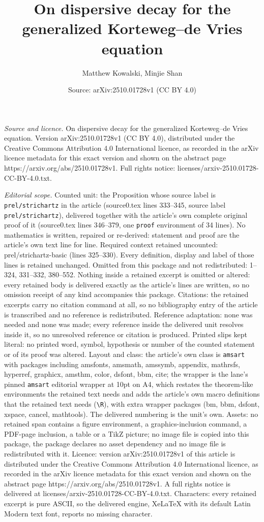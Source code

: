 \documentclass[10pt,a4paper]{amsart}
\title[On dispersive decay for the generalized Korteweg--de Vries e]{On dispersive decay for the generalized Korteweg--de Vries equation}
\author{Matthew Kowalski, Minjie Shan}
\date{Source: arXiv:2510.01728v1 (CC BY 4.0)}
\begin{document}
\maketitle

\noindent\emph{Source and licence.} On dispersive decay for the generalized Korteweg--de Vries equation. Version arXiv:2510.01728v1 (CC BY 4.0), distributed under the Creative Commons Attribution 4.0 International licence, as recorded in the arXiv licence metadata for this exact version and shown on the abstract page https://arxiv.org/abs/2510.01728v1. Full rights notice: licenses/arxiv-2510.01728-CC-BY-4.0.txt.\par\smallskip

\noindent\textit{Editorial scope.} Counted unit: the Proposition whose source label is \texttt{prel/strichartz} in the article (source0.tex lines 333--345, source label \texttt{prel/strichartz}), delivered together with the article's own complete original proof of it (source0.tex lines 346--379, one \texttt{proof} environment of 34 lines). No mathematics is written, repaired or re-derived: statement and proof are the article's own text line for line. Required context retained uncounted: prel/strichartz-basic (lines 325--330). Every definition, display and label of those lines is retained unchanged. Omitted from this package and not redistributed: 1--324, 331--332, 380--552. Nothing inside a retained excerpt is omitted or altered: every retained body is delivered exactly as the article's lines are written, so no omission receipt of any kind accompanies this package. Citations: the retained excerpts carry no citation command at all, so no bibliography entry of the article is transcribed and no reference is redistributed. Reference adaptation: none was needed and none was made; every reference inside the delivered unit resolves inside it, so no unresolved reference or citation is produced. Printed slips kept literal: no printed word, symbol, hypothesis or number of the counted statement or of its proof was altered. Layout and class: the article's own class is \texttt{amsart} with packages including amsfonts, amsmath, amssymb, appendix, mathrsfs, hyperref, graphicx, amsthm, color, dsfont, bbm, cite; the wrapper is the lane's pinned \texttt{amsart} editorial wrapper at 10pt on A4, which restates the theorem-like environments the retained text needs and adds the article's own macro definitions that the retained text needs (\texttt{\textbackslash R}), with extra wrapper packages (bm, bbm, dsfont, xspace, cancel, mathtools). The delivered numbering is the unit's own. Assets: no retained span contains a figure environment, a graphics-inclusion command, a PDF-page inclusion, a table or a TikZ picture; no image file is copied into this package, the package declares no asset dependency and no image file is redistributed with it. Licence: version arXiv:2510.01728v1 of this article is distributed under the Creative Commons Attribution 4.0 International licence, as recorded in the arXiv licence metadata for this exact version and shown on the abstract page https://arxiv.org/abs/2510.01728v1. A full rights notice is delivered at licenses/arxiv-2510.01728-CC-BY-4.0.txt. Characters: every retained excerpt is pure ASCII, so the delivered engine, XeLaTeX with its default Latin Modern text font, reports no missing character.
\end{document}
